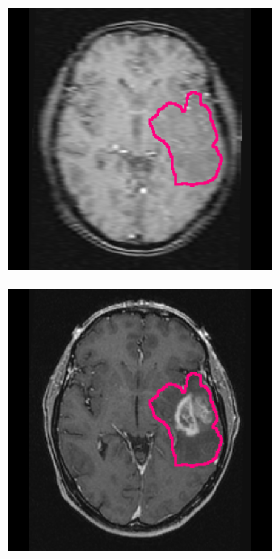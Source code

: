 \begin{subappendices}
\begin{figure}[htbp]
\begin{subfigure}[b]{0.8\textwidth}
\begin{subfigure}[b]{0.215\textwidth}
        \includegraphics[width=\textwidth, clip, trim=2.5cm 0.5cm 2.5cm 0.5cm]{Figures/Random_segs/T1_TCGA-08-0353.png}
        \end{subfigure}
        \hfill
        \begin{subfigure}[b]{0.215\textwidth}
        \includegraphics[width=\textwidth, clip, trim=2.5cm 0.5cm 2.5cm 0.5cm]{Figures/Random_segs/T1GD_TCGA-08-0353.png}

\end{subfigure}
\end{subfigure}
\end{figure}
\end{subappendices}
